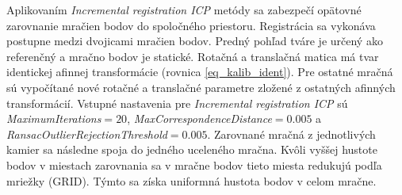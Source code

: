 Aplikovaním \textit{Incremental registration ICP} metódy sa zabezpečí opätovné zarovnanie mračien bodov do spoločného priestoru. Registrácia sa vykonáva postupne medzi dvojicami mračien bodov. Predný pohľad tváre je určený ako referenčný a mračno bodov je statické. Rotačná a translačná matica má tvar identickej afinnej transformácie (rovnica \ref{eq_kalib_ident}). Pre ostatné mračná sú vypočítané nové rotačné a translačné parametre zložené z ostatných afinných transformácií. Vstupné nastavenia pre \textit{Incremental registration ICP} sú \textit{MaximumIterations}$=20$, \textit{MaxCorrespondenceDistance}$=0.005$ a \textit{RansacOutlierRejectionThreshold}$=0.005$. Zarovnané mračná z jednotlivých kamier sa následne spoja do jedného uceleného mračna. Kvôli vyššej hustote bodov v miestach zarovnania sa v mračne bodov tieto miesta redukujú podľa mriežky (GRID). Týmto sa získa uniformná hustota bodov v celom mračne. 
